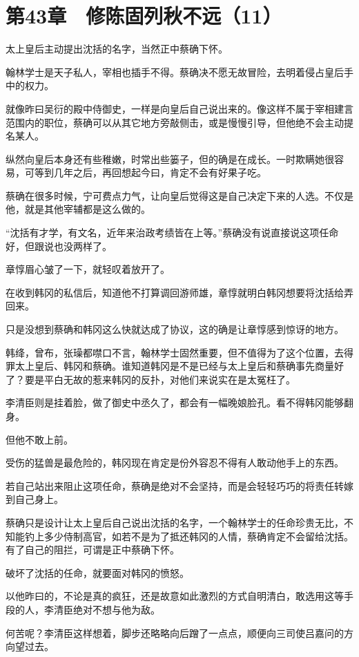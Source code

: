 \section{第43章　修陈固列秋不远（11）}

太上皇后主动提出沈括的名字，当然正中蔡确下怀。

翰林学士是天子私人，宰相也插手不得。蔡确决不愿无故冒险，去明着侵占皇后手中的权力。

就像昨曰吴衍的殿中侍御史，一样是向皇后自己说出来的。像这样不属于宰相建言范围内的职位，蔡确可以从其它地方旁敲侧击，或是慢慢引导，但他绝不会主动提名某人。

纵然向皇后本身还有些稚嫩，时常出些篓子，但的确是在成长。一时欺瞒她很容易，可等到几年之后，再回想起今曰，肯定不会有好果子吃。

蔡确在很多时候，宁可费点力气，让向皇后觉得这是自己决定下来的人选。不仅是他，就是其他宰辅都是这么做的。

“沈括有才学，有文名，近年来治政考绩皆在上等。”蔡确没有说直接说这项任命好，但跟说也没两样了。

章惇眉心皱了一下，就轻叹着放开了。

在收到韩冈的私信后，知道他不打算调回游师雄，章惇就明白韩冈想要将沈括给弄回来。

只是没想到蔡确和韩冈这么快就达成了协议，这的确是让章惇感到惊讶的地方。

韩绛，曾布，张璪都噤口不言，翰林学士固然重要，但不值得为了这个位置，去得罪太上皇后、韩冈和蔡确。谁知道韩冈是不是已经与太上皇后和蔡确事先商量好了？要是平白无故的惹来韩冈的反扑，对他们来说实在是太冤枉了。

李清臣则是挂着脸，做了御史中丞久了，都会有一幅晚娘脸孔。看不得韩冈能够翻身。

但他不敢上前。

受伤的猛兽是最危险的，韩冈现在肯定是份外容忍不得有人敢动他手上的东西。

若自己站出来阻止这项任命，蔡确是绝对不会坚持，而是会轻轻巧巧的将责任转嫁到自己身上。

蔡确只是设计让太上皇后自己说出沈括的名字，一个翰林学士的任命珍贵无比，不知能钓上多少侍制高官，如若不是为了抵还韩冈的人情，蔡确肯定不会留给沈括。有了自己的阻拦，可谓是正中蔡确下怀。

破坏了沈括的任命，就要面对韩冈的愤怒。

以他昨曰的，不论是真的疯狂，还是故意如此激烈的方式自明清白，敢选用这等手段的人，李清臣绝对不想与他为敌。

何苦呢？李清臣这样想着，脚步还略略向后蹭了一点点，顺便向三司使吕嘉问的方向望过去。

